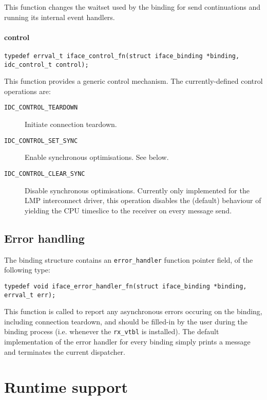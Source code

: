 \documentclass[a4paper,twoside]{report} %
\begin{document}
This function changes the waitset used by the binding for send continuations
and running its internal event handlers.

\subsubsection*{control}

\begin{lstlisting}
typedef errval_t iface_control_fn(struct iface_binding *binding, idc_control_t control);
\end{lstlisting}

This function provides a generic control mechanism. The currently-defined
control operations are:

\begin{description}
 \item[\texttt{IDC\_CONTROL\_TEARDOWN}] Initiate connection teardown.
 \item[\texttt{IDC\_CONTROL\_SET\_SYNC}] Enable synchronous optimisations.
   See below.
 \item[\texttt{IDC\_CONTROL\_CLEAR\_SYNC}] Disable synchronous optimisations.
   Currently only implemented for the LMP interconnect driver, this operation
   disables the (default) behaviour of yielding the CPU timeslice to the
   receiver on every message send.
\end{description}


\section{Error handling}\label{sec:binding_errors}

The binding structure contains an \lstinline+error_handler+ function pointer
field, of the following type:

\begin{lstlisting}
typedef void iface_error_handler_fn(struct iface_binding *binding, errval_t err);
\end{lstlisting}

This function is called to report any asynchronous errors occuring on the
binding, including connection teardown, and should be filled-in by the user
during the binding process (i.e. whenever the \lstinline+rx_vtbl+ is installed).
The default implementation of the error handler for every binding simply
prints a message and terminates the current dispatcher.


\chapter{Runtime support}
\end{document}

